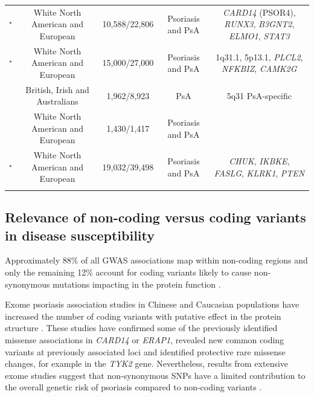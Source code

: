 \begin{landscape}
\begin{center}
\begin{longtable}[ht]{c c c c c}
\parencite{Tsoi2012}$^\star$ & White North American and European & 10,588/22,806 & Psoriasis and PsA & \textit{CARD14} (PSOR4), \textit{RUNX3}, \textit{B3GNT2}, \textit{ELMO1}, \textit{STAT3} \\

\parencite{Tsoi2015}$^\star$	& White North American and European	& 15,000/27,000	& Psoriasis and PsA	& 1q31.1, 5p13.1, \textit{PLCL2}, \textit{NFKBIZ}, \textit{CAMK2G} \\

\parencite{Bowes2015} &	British, Irish and Australians	& 1,962/8,923	& PsA	& 5q31 PsA-specific \\

\parencite{Stuart2015} &	White North American and European	& 1,430/1,417	& Psoriasis and PsA	& \\

\parencite{Tsoi2017}$^\star$ &	White North American and European	& 19,032/39,498	& Psoriasis and PsA	& \textit{CHUK}, \textit{IKBKE}, \textit{FASLG}, \textit{KLRK1}, \textit{PTEN} \\																		
\bottomrule
\medskip
\end{longtable}
\end{center}
\end{landscape}



\subsection{Relevance of non-coding versus coding variants in disease susceptibility}

Approximately 88\% of all GWAS associations map within non-coding regions and only the remaining 12\% account for coding variants likely to cause non-synonymous mutations impacting in the protein function \parencite{Welter2013}.

Exome psoriasis association studies in Chinese and Caucasian populations have increased the number of coding variants with putative effect in the protein structure \parencite{Tang2014,Zuo2015,Dand2017}. These studies have confirmed some of the previously identified missense associations in \textit{CARD14} or \textit{ERAP1}, revealed new common coding variants at previously associated loci and identified protective rare missense changes, for example in the \textit{TYK2} gene\parencite{Tang2014,Dand2017}. Nevertheless, results from extensive exome studies suggest that non-synonymous SNPs have a limited contribution to the overall genetic risk of psoriasis compared to non-coding variants \parencite{Tang2014}.

